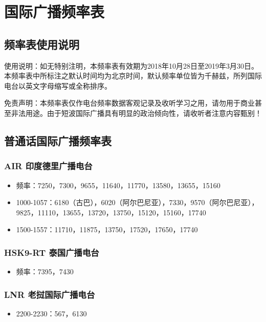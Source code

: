 \documentclass[12pt,UTF8]{ctexbook}
\begin{document}
\section{国际广播频率表}

\subsection{频率表使用说明}

使用说明：如无特别注明，本频率表有效期为2018年10月28日至2019年3月30日。本频率表中所标注之默认时间均为北京时间，默认频率单位皆为千赫兹，所列国际电台以英文字母缩写或全称排序。

免责声明：本频率表仅作电台频率数据客观记录及收听学习之用，请勿用于商业甚至非法用途。由于短波国际广播具有明显的政治倾向性，请收听者注意内容甄别！

\subsection{普通话国际广播频率表}

\subsubsection{AIR 印度德里广播电台}

\begin{itemize}[leftmargin=2cm]
    \item 频率：7250，7300，9655，11640，11770，13580，13655，15160
    \item 1000-1057：6180（古巴），6020（阿尔巴尼亚），7330，9570（阿尔巴尼亚），9825，11110，13655，13720，13750，15120，15160，17740
    \item 1500-1557：11710，11875，13750，17520，17650，17740
\end{itemize}

\subsubsection{HSK9-RT 泰国广播电台}

\begin{itemize}[leftmargin=2cm]
    \item 频率：7395，7430
\end{itemize}

\subsubsection{LNR 老挝国际广播电台}

\begin{itemize}[leftmargin=2cm]
    \item 2200-2230：567，6130
\end{itemize}
\end{document}
